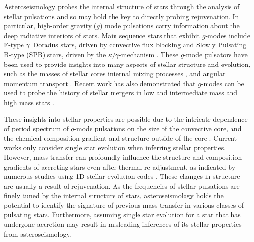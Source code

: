 \documentclass[twocolumn, twocolappendix, oneside]{aastex631}
\newcommand{\gmode}{$g$-mode\xspace}
\newcommand{\gmodes}{$g$-modes\xspace}
\begin{document}
Asteroseismology probes the internal structure of stars through the analysis of stellar pulsations \citep{Aerts+2010} and so may hold the key to directly probing rejuvenation. %
In particular, high-order gravity ($g$) mode pulsations carry information about the deep radiative interiors of stars. Main sequence stars that exhibit \gmodes include F-type $\gamma$~Doradus stars, driven by convective flux blocking \citep{Guzik+2000} and Slowly Pulsating B-type (SPB) stars, driven by the $\kappa/\gamma$-mechanism \citep{Waelkens+1985, Waelkens+1991, Cox+1992, Pamyatnykh+1999}.
These \gmode pulsators have been used to provide insights into many aspects of stellar structure and evolution, such as the masses of stellar cores \citep{Johnston+2021, Pedersen+2022} internal mixing processes \citep{Pedersen+2018,Michielsen+2021}, and angular momentum transport \citep{Aerts+2019,Burssens+2023,Mombarg2023}. Recent work has also demonstrated that \gmodes can be used to probe the history of stellar mergers in low and intermediate mass \citep{Rui+2021} and high mass stars \citep{Bellinger+2023:2023arXiv231100038B}.

These insights into stellar properties are possible due to the intricate dependence of period spectrum of \gmode pulsations on the size of the convective core, and the chemical composition gradient and structure outside of the core \citep[e.g.][]{Miglio+2008,Hatta+2023}. Current works only consider single star evolution when inferring stellar properties. However, mass transfer can profoundly influence the structure and composition gradients of accreting stars even after thermal re-adjustment, as indicated by numerous studies using 1D stellar evolution codes \citep{Braun+1995,Renzo+2021,Miszuda+2021}. These changes in structure are usually a result of rejuvenation. As the frequencies of stellar pulsations are finely tuned by the internal structure of stars, asteroseismology holds the potential to identify the signature of previous mass transfer in various classes of pulsating stars. Furthermore, assuming single star evolution for a star that has undergone accretion may result in misleading inferences of its stellar properties from asteroseismology.
\end{document}
